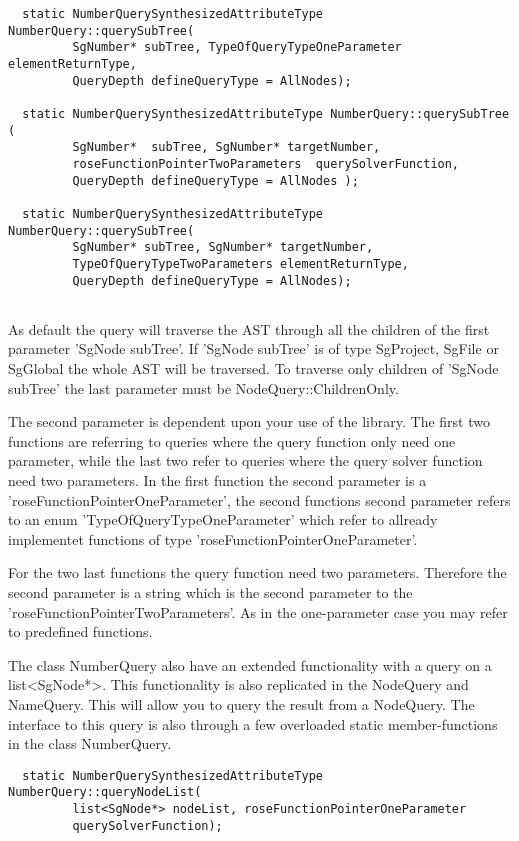 {\begin{verbatim}
  static NumberQuerySynthesizedAttributeType NumberQuery::querySubTree( 
         SgNumber* subTree, TypeOfQueryTypeOneParameter elementReturnType,
         QueryDepth defineQueryType = AllNodes);
	 	
  static NumberQuerySynthesizedAttributeType NumberQuery::querySubTree (
         SgNumber*  subTree, SgNumber* targetNumber,
         roseFunctionPointerTwoParameters  querySolverFunction,
         QueryDepth defineQueryType = AllNodes );
	  
  static NumberQuerySynthesizedAttributeType NumberQuery::querySubTree( 
         SgNumber* subTree, SgNumber* targetNumber, 
         TypeOfQueryTypeTwoParameters elementReturnType,
         QueryDepth defineQueryType = AllNodes);
	  
\end{verbatim}  

As default the query will traverse the AST through all the children of the
first parameter 'SgNode subTree'. If 'SgNode subTree' is of type SgProject, 
SgFile or SgGlobal the whole AST will be traversed. To traverse only children
of 'SgNode subTree' the last parameter must be NodeQuery::ChildrenOnly. 

The second parameter is dependent upon your use of the library. The
first two functions are referring to queries where the query function
only need one parameter, while the last two refer to queries where the 
query solver function need two parameters. In the first function the second
parameter is a 'roseFunctionPointerOneParameter', the second functions
second parameter refers to an enum 'TypeOfQueryTypeOneParameter' which 
refer to allready implementet functions of type 
'roseFunctionPointerOneParameter'. 

For the two last functions the query function need two
parameters. Therefore the second parameter is a string which is the
second parameter to the 'roseFunctionPointerTwoParameters'. As in the
one-parameter case you may refer to predefined functions.

The class NumberQuery also have an extended functionality with a query
on a list<SgNode*>. This functionality is also replicated in the
NodeQuery and NameQuery. This will allow you to query the result
from a NodeQuery. The interface to this query is also through a few
overloaded static member-functions in the class NumberQuery.
\begin{verbatim}
  static NumberQuerySynthesizedAttributeType NumberQuery::queryNodeList(
         list<SgNode*> nodeList, roseFunctionPointerOneParameter
         querySolverFunction);


\end{verbatim}}

